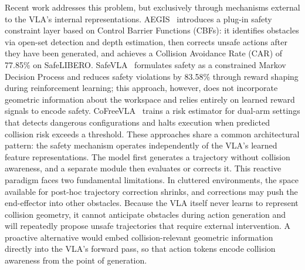Recent work addresses this problem, but exclusively through mechanisms external to the VLA's internal representations. AEGIS~\cite{hu2025vlsa} introduces a plug-in safety constraint layer based on Control Barrier Functions (CBFs): it identifies obstacles via open-set detection and depth estimation, then corrects unsafe actions after they have been generated, and achieves a Collision Avoidance Rate (CAR) of 77.85\% on SafeLIBERO. SafeVLA~\cite{zhang2025safevla} formulates safety as a constrained Markov Decision Process and reduces safety violations by 83.58\% through reward shaping during reinforcement learning; this approach, however, does not incorporate geometric information about the workspace and relies entirely on learned reward signals to encode safety. CoFreeVLA~\cite{cofreeevla2026} trains a risk estimator for dual-arm settings that detects dangerous configurations and halts execution when predicted collision risk exceeds a threshold. These approaches share a common architectural pattern: the safety mechanism operates independently of the VLA's learned feature representations. The model first generates a trajectory without collision awareness, and a separate module then evaluates or corrects it. This reactive paradigm faces two fundamental limitations. In cluttered environments, the space available for post-hoc trajectory correction shrinks, and corrections may push the end-effector into other obstacles. Because the VLA itself never learns to represent collision geometry, it cannot anticipate obstacles during action generation and will repeatedly propose unsafe trajectories that require external intervention. A proactive alternative would embed collision-relevant geometric information directly into the VLA's forward pass, so that action tokens encode collision awareness from the point of generation.

